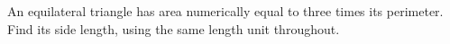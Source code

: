 An equilateral triangle has area numerically equal to three times its perimeter. Find its side length, using the same length unit throughout.
